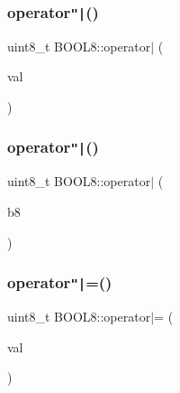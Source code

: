 \hypertarget{struct_b_o_o_l8_a61dc40e130cc220178775071cd37a0bc}{}\label{struct_b_o_o_l8_a61dc40e130cc220178775071cd37a0bc} 
\subsubsection{\texorpdfstring{operator\texttt{"|}()}{operator|()}\hspace{0.1cm}{\footnotesize\ttfamily [1/2]}}
{\footnotesize\ttfamily uint8\+\_\+t B\+O\+O\+L8\+::operator$\vert$ (\begin{DoxyParamCaption}\item[{const uint8\+\_\+t}]{val }\end{DoxyParamCaption})\hspace{0.3cm}{\ttfamily [inline]}}

\hypertarget{struct_b_o_o_l8_a7bbcc21bbabb6e8fe93b6e934c3c7181}{}\label{struct_b_o_o_l8_a7bbcc21bbabb6e8fe93b6e934c3c7181} 
\subsubsection{\texorpdfstring{operator\texttt{"|}()}{operator|()}\hspace{0.1cm}{\footnotesize\ttfamily [2/2]}}
{\footnotesize\ttfamily uint8\+\_\+t B\+O\+O\+L8\+::operator$\vert$ (\begin{DoxyParamCaption}\item[{const \hyperlink{struct_b_o_o_l8}{B\+O\+O\+L8}}]{b8 }\end{DoxyParamCaption})\hspace{0.3cm}{\ttfamily [inline]}}

\hypertarget{struct_b_o_o_l8_a1972e81b43a040e9f7cbb97101ec88d6}{}\label{struct_b_o_o_l8_a1972e81b43a040e9f7cbb97101ec88d6} 
\subsubsection{\texorpdfstring{operator\texttt{"|}=()}{operator|=()}\hspace{0.1cm}{\footnotesize\ttfamily [1/2]}}
{\footnotesize\ttfamily uint8\+\_\+t B\+O\+O\+L8\+::operator$\vert$= (\begin{DoxyParamCaption}\item[{const uint8\+\_\+t}]{val }\end{DoxyParamCaption})\hspace{0.3cm}{\ttfamily [inline]}}

